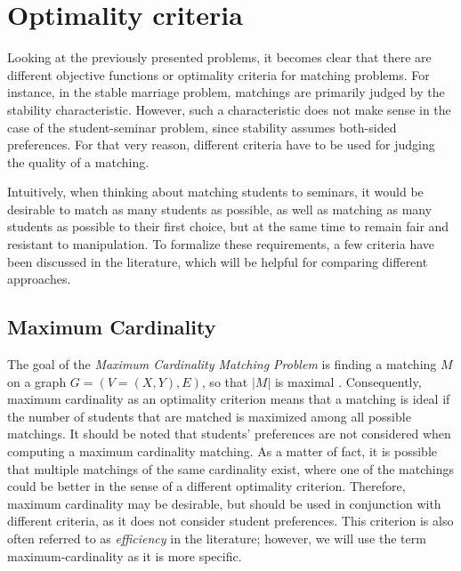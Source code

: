 \section{Optimality criteria}\label{sec:optimality}
Looking at the previously presented problems, it becomes clear that there are different objective functions or optimality criteria for matching problems. For instance, in the stable marriage problem, matchings are primarily judged by the stability characteristic. However, such a characteristic does not make sense in the case of the student-seminar problem, since stability assumes both-sided preferences. For that very reason, different criteria have to be used for judging the quality of a matching.

Intuitively, when thinking about matching students to seminars, it would be desirable to match as many students as possible, as well as matching as many students as possible to their first choice, but at the same time to remain fair and resistant to manipulation. To formalize these requirements, a few criteria have been discussed in the literature, which will be helpful for comparing different approaches. 

\subsection{Maximum Cardinality}
The goal of the \emph{Maximum Cardinality Matching Problem} is finding a matching $M$ on a graph $G=(V=(X, Y), E)$, so that $|M|$ is maximal \cite{GraphTheoryIntro}. Consequently, maximum cardinality as an optimality criterion means that a matching is ideal if the number of students that are matched is maximized among all possible matchings. It should be noted that students' preferences are not considered when computing a maximum cardinality matching. As a matter of fact, it is possible that multiple matchings of the same cardinality exist, where one of the matchings could be better in the sense of a different optimality criterion. Therefore, maximum cardinality may be desirable, but should be used in conjunction with different criteria, as it does not consider student preferences. This criterion is also often referred to as \emph{efficiency} in the literature; however, we will use the term maximum-cardinality as it is more specific.

